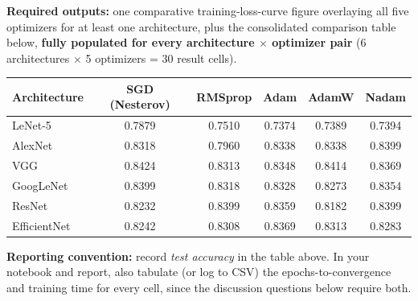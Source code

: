 \documentclass[12pt,a4paper]{article}
\begin{document}
\textbf{Required outputs:} one comparative training-loss-curve figure overlaying all
five optimizers for at least one architecture, plus the consolidated comparison table
below, \textbf{fully populated for every architecture $\times$ optimizer pair}
(6 architectures $\times$ 5 optimizers = 30 result cells).

\begin{center}
\renewcommand{\arraystretch}{1.15}
\footnotesize
\begin{tabular}{|l|c|c|c|c|c|}
\hline
\textbf{Architecture} & \textbf{SGD (Nesterov)} & \textbf{RMSprop} & \textbf{Adam} & \textbf{AdamW} & \textbf{Nadam} \\
\hline
LeNet-5      & 0.7879 & 0.7510 & 0.7374 & 0.7389 & 0.7394 \\
\hline
AlexNet      & 0.8318 & 0.7960 & 0.8338 & 0.8338 & 0.8399 \\
\hline
VGG          & 0.8424 & 0.8313 & 0.8348 & 0.8414 & 0.8369 \\
\hline
GoogLeNet    & 0.8399 & 0.8318 & 0.8328 & 0.8273 & 0.8354 \\
\hline
ResNet       & 0.8232 & 0.8399 & 0.8359 & 0.8182 & 0.8399 \\
\hline
EfficientNet & 0.8242 & 0.8308 & 0.8369 & 0.8313 & 0.8283 \\
\hline
\end{tabular}
\normalsize
\end{center}

\begin{notebox}
\textbf{Reporting convention:} record \emph{test accuracy} in the table above. In your
notebook and report, also tabulate (or log to CSV) the epochs-to-convergence and
training time for every cell, since the discussion questions below require both.
\end{notebox}
\end{document}
